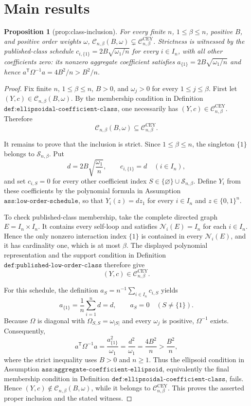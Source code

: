 \documentclass{article}
\newtheorem{proposition}{Proposition}
\begin{document}
\section{Main results}

\begin{proposition}[prop:class-inclusion]\label{prop:class-inclusion}
For every finite \(n\), \(1\le\beta\le n\), positive \(B\), and positive order weights \(\omega\), \(\mathcal C_{n,\beta}(B,\omega)\subsetneq\mathcal C^{\mathrm{CEY}}_{n,\beta}\). Strictness is witnessed by the published-class schedule \(c_{i,\{1\}}=2B\sqrt{\omega_1/n}\) for every \(i\in I_n\), with all other coefficients zero: its nonzero aggregate coefficient satisfies \(a_{\{1\}}=2B\sqrt{\omega_1/n}\) and hence \(a^{\mathsf T}\Omega^{-1}a=4B^2/n>B^2/n\).
\end{proposition}
\begin{proof}
Fix finite \(n\), \(1\le\beta\le n\), \(B>0\), and \(\omega_j>0\) for every \(1\le j\le\beta\). First let \((Y,c)\in\mathcal C_{n,\beta}(B,\omega)\). By the membership condition in Definition \(\texttt{def:ellipsoidal-coefficient-class}\), one necessarily has \((Y,c)\in\mathcal C^{\mathrm{CEY}}_{n,\beta}\). Therefore
\[
\mathcal C_{n,\beta}(B,\omega)\subseteq\mathcal C^{\mathrm{CEY}}_{n,\beta}.
\]

It remains to prove that the inclusion is strict. Since \(1\le\beta\le n\), the singleton \(\{1\}\) belongs to \(\mathcal S_{n,\beta}\). Put
\[
d=2B\sqrt{\frac{\omega_1}{n}},
\qquad
c_{i,\{1\}}=d
\quad(i\in I_n),
\]
and set \(c_{i,S}=0\) for every other coefficient index \(S\in\{\varnothing\}\cup\mathcal S_{n,\beta}\). Define \(Y_i\) from these coefficients by the polynomial formula in Assumption \(\texttt{ass:low-order-schedule}\), so that \(Y_i(z)=d z_1\) for every \(i\in I_n\) and \(z\in\{0,1\}^n\).

To check published-class membership, take the complete directed graph \(E=I_n\times I_n\). It contains every self-loop and satisfies \(\mathcal N_i(E)=I_n\) for each \(i\in I_n\). Hence the only nonzero interaction index \(\{1\}\) is contained in every \(\mathcal N_i(E)\), and it has cardinality one, which is at most \(\beta\). The displayed polynomial representation and the support condition in Definition \(\texttt{def:published-low-order-class}\) therefore give
\[
(Y,c)\in\mathcal C^{\mathrm{CEY}}_{n,\beta}.
\]

For this schedule, the definition \(a_S=n^{-1}\sum_{i\in I_n}c_{i,S}\) yields
\[
a_{\{1\}}
=\frac1n\sum_{i=1}^n d
=d,
\qquad
a_S=0
\quad(S\ne\{1\}).
\]
Because \(\Omega\) is diagonal with \(\Omega_{S,S}=\omega_{|S|}\) and every \(\omega_j\) is positive, \(\Omega^{-1}\) exists. Consequently,
\[
a^{\mathsf T}\Omega^{-1}a
=\frac{a_{\{1\}}^2}{\omega_1}
=\frac{d^2}{\omega_1}
=\frac{4B^2}{n}
>\frac{B^2}{n},
\]
where the strict inequality uses \(B>0\) and \(n\ge1\). Thus the ellipsoid condition in Assumption \(\texttt{ass:aggregate-coefficient-ellipsoid}\), equivalently the final membership condition in Definition \(\texttt{def:ellipsoidal-coefficient-class}\), fails. Hence \((Y,c)\notin\mathcal C_{n,\beta}(B,\omega)\), while it belongs to \(\mathcal C^{\mathrm{CEY}}_{n,\beta}\). This proves the asserted proper inclusion and the stated witness.
\end{proof}
\end{document}
